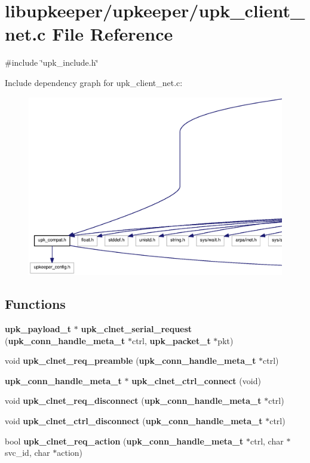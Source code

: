 \section{libupkeeper/upkeeper/upk\_\-client\_\-net.c File Reference}
\label{upk__client__net_8c}
{\ttfamily \#include \char`\"{}upk\_\-include.h\char`\"{}}\par
Include dependency graph for upk\_\-client\_\-net.c:
\nopagebreak
\begin{figure}[H]
\begin{center}
\leavevmode
\includegraphics[width=400pt]{upk__client__net_8c__incl}
\end{center}
\end{figure}
\subsection*{Functions}
\begin{DoxyCompactItemize}
\item 
{\bf upk\_\-payload\_\-t} $\ast$ {\bf upk\_\-clnet\_\-serial\_\-request} ({\bf upk\_\-conn\_\-handle\_\-meta\_\-t} $\ast$ctrl, {\bf upk\_\-packet\_\-t} $\ast$pkt)
\item 
void {\bf upk\_\-clnet\_\-req\_\-preamble} ({\bf upk\_\-conn\_\-handle\_\-meta\_\-t} $\ast$ctrl)
\item 
{\bf upk\_\-conn\_\-handle\_\-meta\_\-t} $\ast$ {\bf upk\_\-clnet\_\-ctrl\_\-connect} (void)
\item 
void {\bf upk\_\-clnet\_\-req\_\-disconnect} ({\bf upk\_\-conn\_\-handle\_\-meta\_\-t} $\ast$ctrl)
\item 
void {\bf upk\_\-clnet\_\-ctrl\_\-disconnect} ({\bf upk\_\-conn\_\-handle\_\-meta\_\-t} $\ast$ctrl)
\item 
bool {\bf upk\_\-clnet\_\-req\_\-action} ({\bf upk\_\-conn\_\-handle\_\-meta\_\-t} $\ast$ctrl, char $\ast$svc\_\-id, char $\ast$action)
\end{DoxyCompactItemize}


